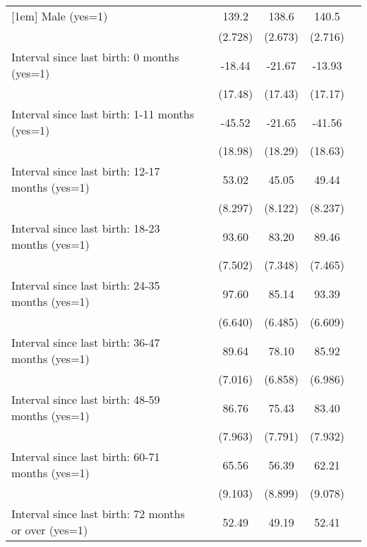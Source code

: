 \begin{tabular}{l*{5}{c}}
[1em]
Male (yes=1)        &            &       139.2&       138.6&       140.5&            \\
                    &            &     (2.728)&     (2.673)&     (2.716)&            \\
[1em]
Interval since last birth: 0 months (yes=1)&            &      -18.44&      -21.67&      -13.93&            \\
                    &            &     (17.48)&     (17.43)&     (17.17)&            \\
[1em]
Interval since last birth: 1-11 months (yes=1)&            &      -45.52&      -21.65&      -41.56&            \\
                    &            &     (18.98)&     (18.29)&     (18.63)&            \\
[1em]
Interval since last birth: 12-17 months (yes=1)&            &       53.02&       45.05&       49.44&            \\
                    &            &     (8.297)&     (8.122)&     (8.237)&            \\
[1em]
Interval since last birth: 18-23 months (yes=1)&            &       93.60&       83.20&       89.46&            \\
                    &            &     (7.502)&     (7.348)&     (7.465)&            \\
[1em]
Interval since last birth: 24-35 months (yes=1)&            &       97.60&       85.14&       93.39&            \\
                    &            &     (6.640)&     (6.485)&     (6.609)&            \\
[1em]
Interval since last birth: 36-47 months (yes=1)&            &       89.64&       78.10&       85.92&            \\
                    &            &     (7.016)&     (6.858)&     (6.986)&            \\
[1em]
Interval since last birth: 48-59 months (yes=1)&            &       86.76&       75.43&       83.40&            \\
                    &            &     (7.963)&     (7.791)&     (7.932)&            \\
[1em]
Interval since last birth: 60-71 months (yes=1)&            &       65.56&       56.39&       62.21&            \\
                    &            &     (9.103)&     (8.899)&     (9.078)&            \\
[1em]
Interval since last birth: 72 months or over (yes=1)&            &       52.49&       49.19&       52.41&            \\

\end{tabular}
